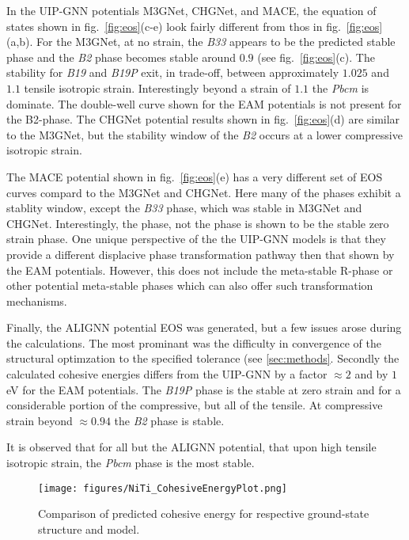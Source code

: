 \documentclass[preprint]{elsarticle}
\begin{document}
In the UIP-GNN potentials M3GNet, CHGNet, and MACE, the equation of states shown in fig.~\ref{fig:eos}(c-e) look fairly different from thos in fig.~\ref{fig:eos}(a,b). For the M3GNet,  at no strain, the \textit{B33} appears to be the predicted stable phase and the \textit{B2} phase becomes stable around $0.9$ (see fig.~\ref{fig:eos}(c). The stability for \textit{B19} and \textit{B19P} exit, in trade-off, between approximately $1.025$ and $1.1$ tensile isotropic strain. Interestingly beyond a strain of $1.1$ the \textit{Pbcm} is dominate. The double-well curve shown for the EAM potentials is not present for the B2-phase. The CHGNet potential results shown in fig.~\ref{fig:eos}(d) are similar to the M3GNet, but the stability window of the \textit{B2} occurs at a lower compressive isotropic strain. \par

The MACE potential shown in fig.~\ref{fig:eos}(e) has a very different set of EOS curves compard to the M3GNet and CHGNet. Here many of the phases exhibit a stablity window, except the \textit{B33} phase, which was stable in M3GNet and CHGNet. Interestingly, the  phase, not the  phase is shown to be the stable zero strain phase. One unique perspective of the the UIP-GNN models is that they provide a different displacive phase transformation pathway then that shown by the EAM potentials. However, this does not include the meta-stable R-phase or other potential meta-stable phases which can also offer such transformation mechanisms. \par


Finally, the ALIGNN potential EOS was generated, but a few issues arose during the calculations. The most prominant was the difficulty in convergence of the structural optimzation to the specified tolerance (see \ref{sec:methods}. Secondly the calculated cohesive energies differs from the UIP-GNN by a factor $\approx 2$ and by $1$ eV for the EAM potentials. The \textit{B19P} phase is the stable at zero strain and for a considerable portion of the compressive, but all of the tensile. At compressive strain beyond $\approx 0.94$ the \textit{B2} phase is stable. 

It is observed that for all but the ALIGNN potential, that upon high tensile isotropic strain, the \textit{Pbcm} phase is the most stable. \par


\begin{figure}[ht!]
    \begin{centering}
        \texttt{[image: figures/NiTi\_CohesiveEnergyPlot.png]}
        \caption{
          Comparison of predicted cohesive energy for respective ground-state structure and model.
        }
        \label{fig:ecoh}
    \end{centering}
\end{figure}
\end{document}
